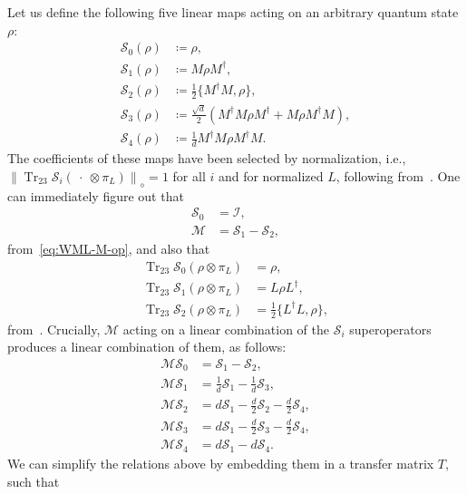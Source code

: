 \documentclass[superscriptaddress,amsmath,amssymb,aps,pra,letterpaper,tightenlines,notitlepages,12pt]{revtex4-2}
\begin{document}
Let us define the following five linear maps acting on an arbitrary quantum state $\rho$:
\begin{align}
    \mathcal{S}_0(\rho) &\coloneqq  \rho,\\
    \mathcal{S}_1(\rho) &\coloneqq  M\rho M^\dagger,\\
    \mathcal{S}_2(\rho) &\coloneqq  \frac{1}{2}\{M^\dagger M, \rho\},\\
    \mathcal{S}_3(\rho) &\coloneqq  \frac{\sqrt{d}}{2}\left(M^\dagger M\rho M^\dagger + M\rho M^\dagger M\right),\\
    \mathcal{S}_4(\rho) &\coloneqq  \frac{1}{d} M^\dagger M\rho M^\dagger M.
\end{align}
The coefficients of these maps have been selected by normalization, i.e., $\left\|\operatorname{Tr}_{23}\mathcal{S}_{i}(~\cdot~\otimes\pi_L)\right\|_\diamond=1$ for all $i$ and for normalized $L$, following from~\cite{go2025SamplebasedHamiltonianLindbladian}. One can immediately figure out that
\begin{align}
\mathcal{S}_0 & =\mathcal{I},\\
\mathcal{M} & =\mathcal{S}_1-\mathcal{S}_2,
\end{align}
from~\eqref{eq:WML-M-op}, and also that 
\begin{align}
\operatorname{Tr}_{23}\mathcal{S}_{0}(\rho\otimes\pi_L) & =\rho,
\\
\operatorname{Tr}_{23}\mathcal{S}_{1}(\rho\otimes\pi_L) & =L\rho L^\dagger, \\
\operatorname{Tr}_{23}\mathcal{S}_{2}(\rho\otimes\pi_L) & =\tfrac{1}{2}\{L^\dagger L, \rho\},
\end{align}
from~\cite{patel2023WaveMatrixLindbladization}. Crucially, $\mathcal{M}$ acting on a linear combination of the $\mathcal{S}_i$ superoperators produces  a linear combination of them, as follows:
\begin{align}
    \mathcal{M}\mathcal{S}_0 &= \mathcal{S}_1-\mathcal{S}_2,\\
    \mathcal{M}\mathcal{S}_1 &= \frac{1}{d}\mathcal{S}_1-\frac{1}{d}\mathcal{S}_3,\\
    \mathcal{M}\mathcal{S}_2 &= d\mathcal{S}_1-\frac{d}{2}\mathcal{S}_2-\frac{d}{2}\mathcal{S}_4,\\
    \mathcal{M}\mathcal{S}_3 &= d\mathcal{S}_1-\frac{d}{2}\mathcal{S}_3-\frac{d}{2}\mathcal{S}_4,\\
    \mathcal{M}\mathcal{S}_4 &= d\mathcal{S}_1-d\mathcal{S}_4.
\end{align}
We can simplify the relations above by embedding them in a transfer matrix $T$, such that
\end{document}
